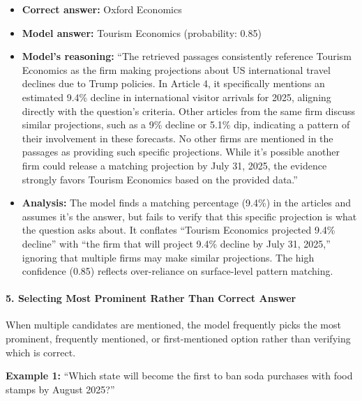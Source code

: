 \begin{itemize}
\item \textbf{Correct answer:} Oxford Economics
\item \textbf{Model answer:} Tourism Economics (probability: 0.85)
\item \textbf{Model's reasoning:} ``The retrieved passages consistently reference Tourism Economics as the firm making projections about US international travel declines due to Trump policies. In Article 4, it specifically mentions an estimated 9.4\% decline in international visitor arrivals for 2025, aligning directly with the question's criteria. Other articles from the same firm discuss similar projections, such as a 9\% decline or 5.1\% dip, indicating a pattern of their involvement in these forecasts. No other firms are mentioned in the passages as providing such specific projections. While it's possible another firm could release a matching projection by July 31, 2025, the evidence strongly favors Tourism Economics based on the provided data.''
\item \textbf{Analysis:} The model finds a matching percentage (9.4\%) in the articles and assumes it's the answer, but fails to verify that this specific projection is what the question asks about. It conflates ``Tourism Economics projected 9.4\% decline'' with ``the firm that will project 9.4\% decline by July 31, 2025,'' ignoring that multiple firms may make similar projections. The high confidence (0.85) reflects over-reliance on surface-level pattern matching.
\end{itemize}

\paragraph{5. Selecting Most Prominent Rather Than Correct Answer}

When multiple candidates are mentioned, the model frequently picks the most prominent, frequently mentioned, or first-mentioned option rather than verifying which is correct.

\textbf{Example 1:} ``Which state will become the first to ban soda purchases with food stamps by August 2025?''

